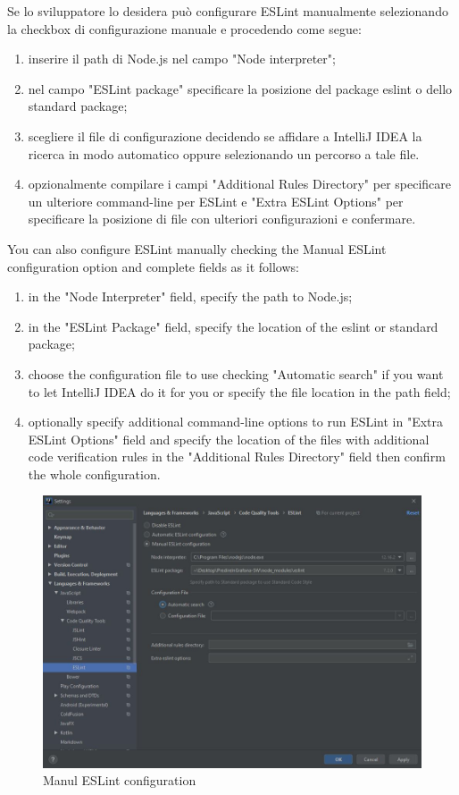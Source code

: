 	Se lo sviluppatore lo desidera può configurare ESLint manualmente selezionando la checkbox di configurazione manuale e procedendo come segue: 
	\begin{enumerate}
		\item inserire il path di Node.js nel campo "Node interpreter";
		\item nel campo "ESLint package" specificare la posizione del package eslint o dello standard package;
		\item scegliere il file di configurazione decidendo se affidare a IntelliJ IDEA la ricerca in modo automatico oppure selezionando un percorso a tale file. 
		\item opzionalmente compilare i campi "Additional Rules Directory" per specificare un ulteriore command-line per ESLint e  "Extra ESLint Options" per specificare la posizione di file con ulteriori configurazioni e confermare.
	\end{enumerate}
		
		You can also configure ESLint manually checking the Manual ESLint configuration option and complete fields as it follows:
		\begin{enumerate}
			\item in the "Node Interpreter" field, specify the path to Node.js;
			\item in the "ESLint Package" field, specify the location of the eslint or standard package;
			\item choose the configuration file to use checking "Automatic search" if you want to let IntelliJ IDEA do it for you or specify the file location in the path field;
			\item optionally specify additional command-line options to run ESLint in "Extra ESLint Options" field and specify the location of the files with additional code verification rules in the "Additional Rules Directory" field then confirm the whole configuration.
		\end{enumerate}
		

\begin{figure}[H]
		\centering
		\includegraphics[scale=0.60]{../Developer_manual/img/manual_eslint_configuration.jpg}
		\caption{Manul ESLint configuration}
	\end{figure}	

